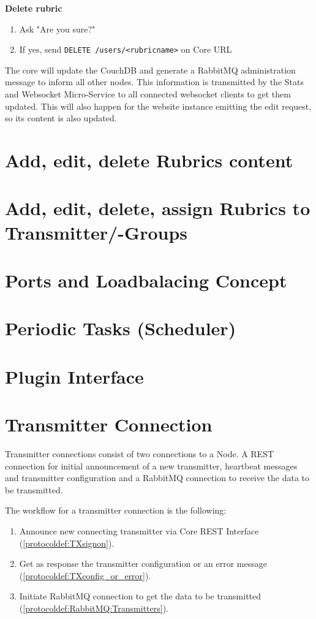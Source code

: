 \textbf{Delete rubric}
\begin{enumerate}
\item Ask "Are you sure?"
\item If yes, send \texttt{DELETE /users/<rubricname>} on Core URL
\end{enumerate}

The core will update the CouchDB and generate a RabbitMQ administration message
to inform all other nodes. This information is transmitted by the Stats and
Websocket Micro-Service to all connected websocket clients to get them updated.
This will also happen for the website instance emitting the edit request, so its
content is also updated.

\section{Add, edit, delete Rubrics content}

\section{Add, edit, delete, assign Rubrics to Transmitter/-Groups}

\section{Ports and Loadbalacing Concept}

\section{Periodic Tasks (Scheduler)}

\section{Plugin Interface}

\section{Transmitter Connection}
Transmitter connections consist of two connections to a Node. A REST connection
for initial announcement of a new transmitter, heartbeat messages and
transmitter configuration and a RabbitMQ connection to receive the data to be
transmitted.

The workflow for a transmitter connection is the following:
\begin{enumerate}
\item Announce new connecting transmitter via Core REST Interface (\ref{protocoldef:TXsignon}).
\item Get as response the transmitter configuration or an error message (\ref{protocoldef:TXconfig_or_error}).
\item Initiate RabbitMQ connection to get the data to be transmitted (\ref{protocoldef:RabbitMQ:Transmitters}).
\end{enumerate}

